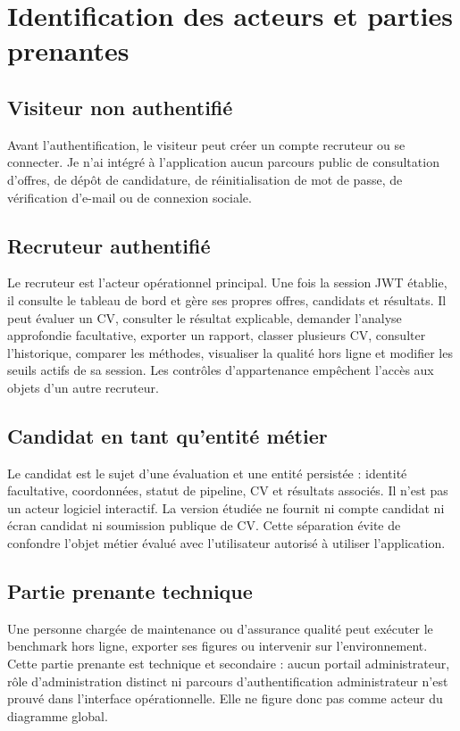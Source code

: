 \section{Identification des acteurs et parties prenantes}
\subsection{Visiteur non authentifié}
Avant l'authentification, le visiteur peut créer un compte recruteur ou se connecter. Je n'ai intégré à l'application aucun parcours public de consultation d'offres, de dépôt de candidature, de réinitialisation de mot de passe, de vérification d'e-mail ou de connexion sociale.

\subsection{Recruteur authentifié}
Le recruteur est l'acteur opérationnel principal. Une fois la session JWT établie, il consulte le tableau de bord et gère ses propres offres, candidats et résultats. Il peut évaluer un CV, consulter le résultat explicable, demander l'analyse approfondie facultative, exporter un rapport, classer plusieurs CV, consulter l'historique, comparer les méthodes, visualiser la qualité hors ligne et modifier les seuils actifs de sa session. Les contrôles d'appartenance empêchent l'accès aux objets d'un autre recruteur.

\subsection{Candidat en tant qu'entité métier}
Le candidat est le sujet d'une évaluation et une entité persistée : identité facultative, coordonnées, statut de pipeline, CV et résultats associés. Il n'est pas un acteur logiciel interactif. La version étudiée ne fournit ni compte candidat ni écran candidat ni soumission publique de CV. Cette séparation évite de confondre l'objet métier évalué avec l'utilisateur autorisé à utiliser l'application.

\subsection{Partie prenante technique}
Une personne chargée de maintenance ou d'assurance qualité peut exécuter le benchmark hors ligne, exporter ses figures ou intervenir sur l'environnement. Cette partie prenante est technique et secondaire : aucun portail administrateur, rôle d'administration distinct ni parcours d'authentification administrateur n'est prouvé dans l'interface opérationnelle. Elle ne figure donc pas comme acteur du diagramme global.

